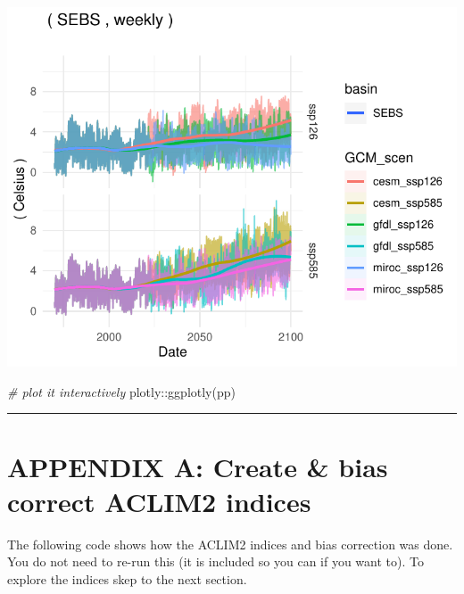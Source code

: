 \documentclass[
]{article}
\newenvironment{Shaded}{\begin{snugshade}}{\end{snugshade}}
\newcommand{\CommentTok}[1]{\textcolor[rgb]{0.56,0.35,0.01}{\textit{#1}}}
\newcommand{\FunctionTok}[1]{\textcolor[rgb]{0.00,0.00,0.00}{#1}}
\newcommand{\NormalTok}[1]{#1}
\newcommand{\SpecialCharTok}[1]{\textcolor[rgb]{0.00,0.00,0.00}{#1}}
\begin{document}
\begin{center}\includegraphics{ACLIM2_quickStart_files/figure-latex/sizespec-2} \end{center}

\begin{Shaded}
\begin{Highlighting}[]
\CommentTok{\# plot it interactively}
\NormalTok{plotly}\SpecialCharTok{::}\FunctionTok{ggplotly}\NormalTok{(pp)}
\end{Highlighting}
\end{Shaded}

\begin{center}\rule{0.5\linewidth}{0.5pt}\end{center}

\hypertarget{appendix-a-create-bias-correct-aclim2-indices}{%
\section{APPENDIX A: Create \& bias correct ACLIM2
indices}\label{appendix-a-create-bias-correct-aclim2-indices}}

The following code shows how the ACLIM2 indices and bias correction was
done. You do not need to re-run this (it is included so you can if you
want to). To explore the indices skep to the next section.
\end{document}
